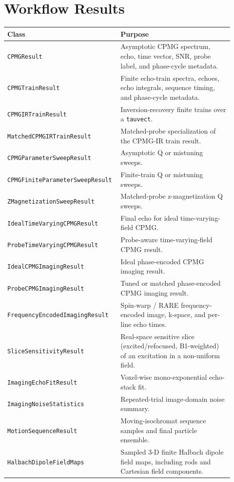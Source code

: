 \documentclass[11pt,oneside]{report}
\newcommand{\code}[1]{\texttt{#1}}
\begin{document}
\section{Workflow Results}

\begin{longtable}{p{0.43\linewidth}p{0.49\linewidth}}
\toprule
Class & Purpose \\
\midrule
\code{CPMGResult} & Asymptotic CPMG spectrum, echo, time vector, SNR, probe label, and phase-cycle metadata. \\
\code{CPMGTrainResult} & Finite echo-train spectra, echoes, echo integrals, sequence timing, and phase-cycle metadata. \\
\code{CPMGIRTrainResult} & Inversion-recovery finite trains over a \code{tauvect}. \\
\code{MatchedCPMGIRTrainResult} & Matched-probe specialization of the CPMG-IR train result. \\
\code{CPMGParameterSweepResult} & Asymptotic Q or mistuning sweeps. \\
\code{CPMGFiniteParameterSweepResult} & Finite-train Q or mistuning sweeps. \\
\code{ZMagnetizationSweepResult} & Matched-probe z-magnetization Q sweeps. \\
\code{IdealTimeVaryingCPMGResult} & Final echo for ideal time-varying-field CPMG. \\
\code{ProbeTimeVaryingCPMGResult} & Probe-aware time-varying-field CPMG result. \\
\code{IdealCPMGImagingResult} & Ideal phase-encoded CPMG imaging result. \\
\code{ProbeCPMGImagingResult} & Tuned or matched phase-encoded CPMG imaging result. \\
\code{FrequencyEncodedImagingResult} & Spin-warp / RARE frequency-encoded image, k-space, and per-line echo times. \\
\code{SliceSensitivityResult} & Real-space sensitive slice (excited/refocused, B1-weighted) of an excitation in a non-uniform field. \\
\code{ImagingEchoFitResult} & Voxel-wise mono-exponential echo-stack fit. \\
\code{ImagingNoiseStatistics} & Repeated-trial image-domain noise summary. \\
\code{MotionSequenceResult} & Moving-isochromat sequence samples and final particle ensemble. \\
\code{HalbachDipoleFieldMaps} & Sampled 3-D finite Halbach dipole field maps, including rods and Cartesian field components. \\

\end{longtable}
\end{document}
